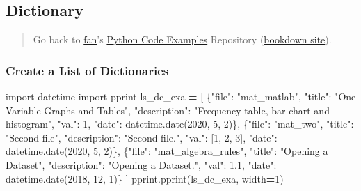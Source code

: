 \documentclass[
]{book}
\newenvironment{Shaded}{\begin{snugshade}}{\end{snugshade}}
\newcommand{\DecValTok}[1]{\textcolor[rgb]{0.00,0.00,0.81}{#1}}
\newcommand{\FloatTok}[1]{\textcolor[rgb]{0.00,0.00,0.81}{#1}}
\newcommand{\ImportTok}[1]{#1}
\newcommand{\NormalTok}[1]{#1}
\newcommand{\OperatorTok}[1]{\textcolor[rgb]{0.81,0.36,0.00}{\textbf{#1}}}
\newcommand{\StringTok}[1]{\textcolor[rgb]{0.31,0.60,0.02}{#1}}
\begin{document}
\hypertarget{dictionary-1}{%
\subsection{Dictionary}\label{dictionary-1}}

\begin{quote}
Go back to \href{http://fanwangecon.github.io/}{fan}'s \href{https://fanwangecon.github.io/pyfan/}{Python Code Examples} Repository (\href{https://fanwangecon.github.io/pyfan/bookdown}{bookdown site}).
\end{quote}

\hypertarget{create-a-list-of-dictionaries}{%
\subsubsection{Create a List of Dictionaries}\label{create-a-list-of-dictionaries}}

\begin{Shaded}
\begin{Highlighting}[]
\ImportTok{import}\NormalTok{ datetime}
\ImportTok{import}\NormalTok{ pprint}
\NormalTok{ls_dc_exa }\OperatorTok{=}\NormalTok{  [}
\NormalTok{    \{}\StringTok{"file"}\NormalTok{: }\StringTok{"mat_matlab"}\NormalTok{,}
     \StringTok{"title"}\NormalTok{: }\StringTok{"One Variable Graphs and Tables"}\NormalTok{,}
     \StringTok{"description"}\NormalTok{: }\StringTok{"Frequency table, bar chart and histogram"}\NormalTok{,}
     \StringTok{"val"}\NormalTok{: }\DecValTok{1}\NormalTok{,}
     \StringTok{"date"}\NormalTok{: datetime.date(}\DecValTok{2020}\NormalTok{, }\DecValTok{5}\NormalTok{, }\DecValTok{2}\NormalTok{)\},}
\NormalTok{    \{}\StringTok{"file"}\NormalTok{: }\StringTok{"mat_two"}\NormalTok{,}
     \StringTok{"title"}\NormalTok{: }\StringTok{"Second file"}\NormalTok{,}
     \StringTok{"description"}\NormalTok{: }\StringTok{"Second file."}\NormalTok{,}
     \StringTok{"val"}\NormalTok{: [}\DecValTok{1}\NormalTok{, }\DecValTok{2}\NormalTok{, }\DecValTok{3}\NormalTok{],}
     \StringTok{"date"}\NormalTok{: datetime.date(}\DecValTok{2020}\NormalTok{, }\DecValTok{5}\NormalTok{, }\DecValTok{2}\NormalTok{)\},}
\NormalTok{    \{}\StringTok{"file"}\NormalTok{: }\StringTok{"mat_algebra_rules"}\NormalTok{,}
     \StringTok{"title"}\NormalTok{: }\StringTok{"Opening a Dataset"}\NormalTok{,}
     \StringTok{"description"}\NormalTok{: }\StringTok{"Opening a Dataset."}\NormalTok{,}
     \StringTok{"val"}\NormalTok{: }\FloatTok{1.1}\NormalTok{,}
     \StringTok{"date"}\NormalTok{: datetime.date(}\DecValTok{2018}\NormalTok{, }\DecValTok{12}\NormalTok{, }\DecValTok{1}\NormalTok{)\}}
\NormalTok{]}
\NormalTok{pprint.pprint(ls_dc_exa, width}\OperatorTok{=}\DecValTok{1}\NormalTok{)}
\end{Highlighting}
\end{Shaded}
\end{document}
